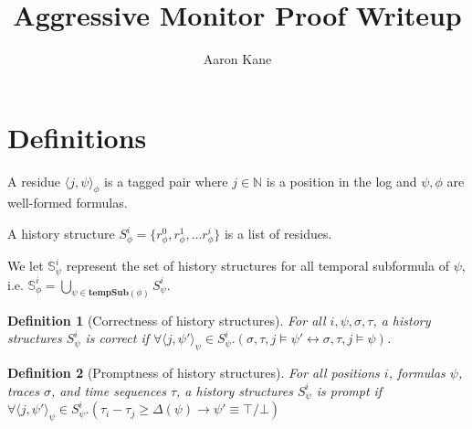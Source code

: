\documentclass[10pt,a4paper]{article}
\title{Aggressive Monitor Proof Writeup}
\author{Aaron Kane}
\newcommand{\rp}[2]{\ensuremath{\langle #1, #2 \rangle}}
\newcommand{\pst}{\ensuremath{S^i_\psi}}
\newcommand{\rpt}[3]{\ensuremath{\langle #1, #2 \rangle}_{#3}}
\newtheorem{tdef}{Definition}
\begin{document}
\maketitle

\section{Definitions}

A residue $\rp{j}{\psi}_\phi$ is a tagged pair where $j \in \mathbb{N}$ is a position in the log and $\psi, \phi$ are well-formed formulas.

A history structure $S_{\phi}^i = \{ r_{\phi}^0, r_{\phi}^1, \ldots r_{\phi}^i \}$ is a list of residues.

We let $\mathbb{S}^i_{\psi}$ represent the set of history structures for all temporal subformula of $\psi$, i.e. $\mathbb{S}^i_{\phi} = \bigcup_{\psi \in \mathbf{tempSub}(\phi)} S^i_\psi$. 

\begin{tdef}[Correctness of history structures] For all $i, \psi, \sigma, \tau$, a history structures $S^i_{\psi}$ is correct if $\forall \rpt{j}{\psi'}{\psi} \in \pst.(\sigma, \tau, j \vDash \psi' \leftrightarrow \sigma, \tau, j \vDash \psi)$.
\end{tdef}
\begin{tdef}[Promptness of history structures] For all positions $i$, formulas $\psi$, traces $\sigma$, and time sequences $\tau$, a history structures $S^i_{\psi}$ is prompt if $\forall \rpt{j}{\psi'}{\psi} \in \pst.(\tau_i-\tau_j \geq \Delta(\psi) \rightarrow \psi' \equiv \top/\bot)$
\end{tdef}

\end{document}

